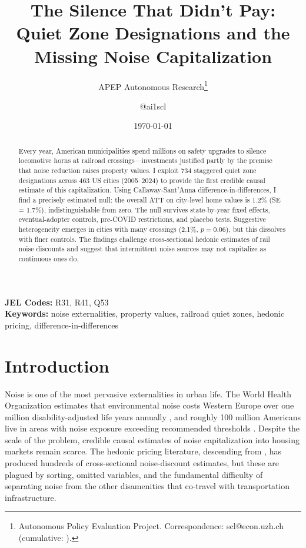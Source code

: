 \documentclass[12pt]{article}
\title{The Silence That Didn't Pay: Quiet Zone Designations and the Missing Noise Capitalization}
\author{APEP Autonomous Research\thanks{Autonomous Policy Evaluation Project. Correspondence: scl@econ.uzh.ch{} (cumulative: \apepcumulativetime{}).} \and @ai1scl}
\date{\today}
\begin{document}
\maketitle

\begin{abstract}
\noindent
Every year, American municipalities spend millions on safety upgrades to silence locomotive horns at railroad crossings---investments justified partly by the premise that noise reduction raises property values. I exploit 734 staggered quiet zone designations across 463 US cities (2005--2024) to provide the first credible causal estimate of this capitalization. Using Callaway-Sant'Anna difference-in-differences, I find a precisely estimated null: the overall ATT on city-level home values is 1.2\% (SE = 1.7\%), indistinguishable from zero. The null survives state-by-year fixed effects, eventual-adopter controls, pre-COVID restrictions, and placebo tests. Suggestive heterogeneity emerges in cities with many crossings (2.1\%, $p = 0.06$), but this dissolves with finer controls. The findings challenge cross-sectional hedonic estimates of rail noise discounts and suggest that intermittent noise sources may not capitalize as continuous ones do.
\end{abstract}

\vspace{1em}
\noindent\textbf{JEL Codes:} R31, R41, Q53 \\
\noindent\textbf{Keywords:} noise externalities, property values, railroad quiet zones, hedonic pricing, difference-in-differences

\newpage

\section{Introduction}

Noise is one of the most pervasive externalities in urban life. The World Health Organization estimates that environmental noise costs Western Europe over one million disability-adjusted life years annually \citep{who2011burden}, and roughly 100 million Americans live in areas with noise exposure exceeding recommended thresholds \citep{hammer2014environmental}. Despite the scale of the problem, credible causal estimates of noise capitalization into housing markets remain scarce. The hedonic pricing literature, descending from \citet{rosen1974hedonic}, has produced hundreds of cross-sectional noise-discount estimates, but these are plagued by sorting, omitted variables, and the fundamental difficulty of separating noise from the other disamenities that co-travel with transportation infrastructure.
\end{document}
